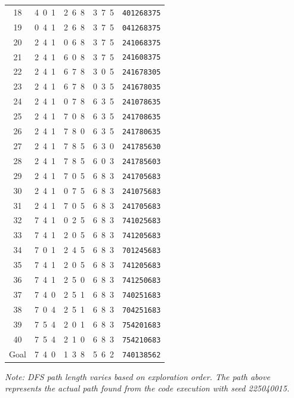 \documentclass[12pt, a4paper]{article}
\begin{document}
\begin{center}
\begin{tabular}{ccccc}
18 & 4\ 0\ 1 & 2\ 6\ 8 & 3\ 7\ 5 & \texttt{401268375} \\
19 & 0\ 4\ 1 & 2\ 6\ 8 & 3\ 7\ 5 & \texttt{041268375} \\
20 & 2\ 4\ 1 & 0\ 6\ 8 & 3\ 7\ 5 & \texttt{241068375} \\
21 & 2\ 4\ 1 & 6\ 0\ 8 & 3\ 7\ 5 & \texttt{241608375} \\
22 & 2\ 4\ 1 & 6\ 7\ 8 & 3\ 0\ 5 & \texttt{241678305} \\
23 & 2\ 4\ 1 & 6\ 7\ 8 & 0\ 3\ 5 & \texttt{241678035} \\
24 & 2\ 4\ 1 & 0\ 7\ 8 & 6\ 3\ 5 & \texttt{241078635} \\
25 & 2\ 4\ 1 & 7\ 0\ 8 & 6\ 3\ 5 & \texttt{241708635} \\
26 & 2\ 4\ 1 & 7\ 8\ 0 & 6\ 3\ 5 & \texttt{241780635} \\
27 & 2\ 4\ 1 & 7\ 8\ 5 & 6\ 3\ 0 & \texttt{241785630} \\
28 & 2\ 4\ 1 & 7\ 8\ 5 & 6\ 0\ 3 & \texttt{241785603} \\
29 & 2\ 4\ 1 & 7\ 0\ 5 & 6\ 8\ 3 & \texttt{241705683} \\
30 & 2\ 4\ 1 & 0\ 7\ 5 & 6\ 8\ 3 & \texttt{241075683} \\
31 & 2\ 4\ 1 & 7\ 0\ 5 & 6\ 8\ 3 & \texttt{241705683} \\
32 & 7\ 4\ 1 & 0\ 2\ 5 & 6\ 8\ 3 & \texttt{741025683} \\
33 & 7\ 4\ 1 & 2\ 0\ 5 & 6\ 8\ 3 & \texttt{741205683} \\
34 & 7\ 0\ 1 & 2\ 4\ 5 & 6\ 8\ 3 & \texttt{701245683} \\
35 & 7\ 4\ 1 & 2\ 0\ 5 & 6\ 8\ 3 & \texttt{741205683} \\
36 & 7\ 4\ 1 & 2\ 5\ 0 & 6\ 8\ 3 & \texttt{741250683} \\
37 & 7\ 4\ 0 & 2\ 5\ 1 & 6\ 8\ 3 & \texttt{740251683} \\
38 & 7\ 0\ 4 & 2\ 5\ 1 & 6\ 8\ 3 & \texttt{704251683} \\
39 & 7\ 5\ 4 & 2\ 0\ 1 & 6\ 8\ 3 & \texttt{754201683} \\
40 & 7\ 5\ 4 & 2\ 1\ 0 & 6\ 8\ 3 & \texttt{754210683} \\
\rowcolor{lightblue}
Goal & 7\ 4\ 0 & 1\ 3\ 8 & 5\ 6\ 2 & \texttt{740138562} \\
\bottomrule
\end{tabular}
\end{center}

\medskip
\noindent\textit{Note: DFS path length varies based on exploration order. The path above represents the actual path found from the code execution with seed 225040015.}
\end{document}
